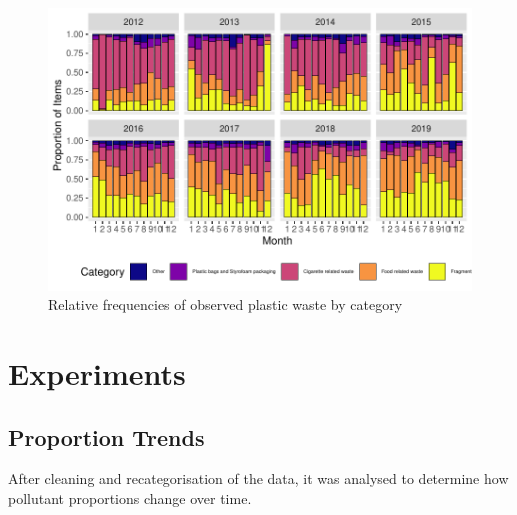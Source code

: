 \documentclass[10pt]{article}\usepackage[]{graphicx}\usepackage[]{color}
\newenvironment{knitrout}{}{} %
\begin{document}
\begin{figure}[H]
\begin{center}
\begin{knitrout}
\includegraphics[width=1\linewidth]{figure/unnamed-chunk-20-1} 

\end{knitrout}
\caption {Relative frequencies of observed plastic waste by category}
\label{figB}
\end {center}
\end {figure}


















\pagebreak
\section{Experiments}



\subsection{Proportion Trends}
After cleaning and recategorisation of the data, it was analysed to determine how pollutant proportions change over time.\\
\end{document}
